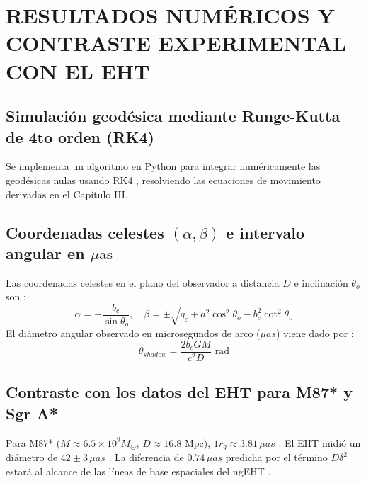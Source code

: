 \chapter{RESULTADOS NUMÉRICOS Y CONTRASTE EXPERIMENTAL CON EL EHT}

\section{Simulación geodésica mediante Runge-Kutta de 4to orden (RK4)}
Se implementa un algoritmo en Python para integrar numéricamente las geodésicas nulas usando RK4 \citep{Geod_sicas_en_la_m_trica_de_Schwarzschild__una_soluci_n_num_rica, TFG-G7513}, resolviendo las ecuaciones de movimiento derivadas en el Capítulo III.

\section{Coordenadas celestes \texorpdfstring{$(\alpha, \beta)$}{(alpha, beta)} e intervalo angular en \texorpdfstring{$\mu\text{as}$}{microsegundos de arco}}
Las coordenadas celestes en el plano del observador a distancia $D$ e inclinación $\theta_o$ son \citep{1403.5234v2, 2406.09498v1}:
\begin{equation}
    \alpha = -\frac{b_c}{\sin\theta_o}, \quad \beta = \pm \sqrt{q_c + a^2 \cos^2\theta_o - b_c^2 \cot^2\theta_o}
\end{equation}
El diámetro angular observado en microsegundos de arco ($\mu as$) viene dado por \citep{Broderick_2022_ApJ_927_6, Reproducibility_of_the_First_Image_of_a_Black_Hole_in_the_Galaxy_M87_From_the_Event_Horizon_Telescope_Collaboration}:
\begin{equation}
    \theta_{shadow} = \frac{2 b_c GM}{c^2 D} \text{ rad}
\end{equation}

\section{Contraste con los datos del EHT para M87* y Sgr A*}
Para M87* ($M \approx 6.5 \times 10^9 M_\odot$, $D \approx 16.8 \text{ Mpc}$), $1 r_g \approx 3.81 \, \mu as$ \citep{Broderick_2022_ApJ_927_6, EHT_Paper1}. El EHT midió un diámetro de $42 \pm 3 \, \mu as$ \citep{EHT_Paper1}. La diferencia de $0.74 \, \mu as$ predicha por el término $D\delta^2$ estará al alcance de las líneas de base espaciales del ngEHT \citep{Measuring_Photon_Rings_with_the_ngEHT}.

